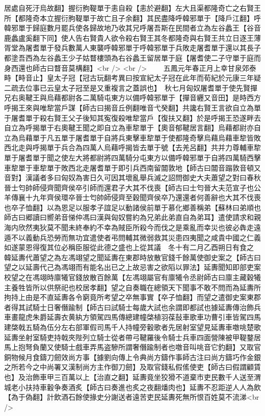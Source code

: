 居處自死汙烏故翻】握衍朐鞮單于恚自殺【恚於避翻】左大且渠都隆奇亡之右賢王所【都隆奇本立握衍朐鞮單于故亡且子余翻】其民盡降呼韓邪單于【降戶江翻】呼韓邪單于歸庭數月罷兵使各歸故地乃收其兄呼屠吾斯在民間者立為左谷蠡王【谷音鹿蠡盧奚翻下同】使人告右賢貴人欲令殺右賢王其冬都隆奇與右賢王共立日逐王薄胥堂為屠耆單于發兵數萬人東襲呼韓邪單于呼韓邪單于兵敗走屠耆單于還以其長子都塗吾西為左谷蠡王少子姑瞀樓頭為右谷蠡王留居單于庭【屠耆使二子守單于庭而身西還也師古曰瞀音莫構翻】<br />
<br />
　　五鳳元年春正月上幸甘泉郊泰畤【畤音止】皇太子冠【冠古玩翻考異曰按宣紀太子冠在此年而荀紀於元康三年疑二疏去位事已云皇太子冠至是又重複言之蓋誤也】　秋七月匈奴屠耆單于使先賢撣兄右奥鞬王與烏藉都尉各二萬騎屯東方以備呼韓邪單于【撣音纒又音田】是時西方呼揭王來與唯犂當戶謀【師古曰揭音丘例翻唯音弋癸翻】共讒右賢王言欲自立為單于屠耆單于殺右賢王父子後知其寃復殺唯犂當戶【復扶又翻】於是呼揭王恐遂畔去自立為呼揭單于右奧鞬王聞之即自立為車犂單于【奧音郁鞬居言翻】烏藉都尉亦自立為烏藉單于凡五單于屠耆單于自將兵東擊車犂單于使都隆奇擊烏藉烏藉車犂皆敗西北走與呼揭單于兵合為四萬人烏藉呼揭皆去單于號【去羌呂翻】共并力尊輔車犂單于屠耆單于聞之使左大將都尉將四萬騎分屯東方以備呼韓邪單于自將四萬騎西擊車犂單于車犂單于敗西北走屠耆單于即引兵西南留闒敦地【師古曰闒音蹋敦音頓又音對】漢議者多曰匈奴為害日久可因其壞亂舉兵滅之詔問御史大夫蕭望之對曰春秋晉士匄帥師侵齊聞齊侯卒引師而還君子大其不伐喪【師古曰士匄晉大夫范宣子也公羊傳襄十九年齊侯環卒晉士匄帥師侵齊至穀聞齊侯卒乃還還者何善辭也大其不伐喪也卒子恤翻】以為恩足以服孝子誼足以動諸侯前單于慕化鄉善稱弟【蘇林曰弟順也師古曰郷讀曰嚮弟音悌仲馮曰漢與匈奴嘗約為兄弟此弟直自為弟耳】遣使請求和親海内欣然夷狄莫不聞未終奉約不幸為賊臣所殺今而伐之是乘亂而幸災也彼必犇走遠遁不以義動兵恐勞而無功宜遣使者弔問輔其微弱救其災患四夷聞之咸貴中國之仁義如遂蒙恩得復其位必稱臣服從此德之盛也上從其議　冬十有二月乙酉朔日有食之　韓延夀代蕭望之為左馮翊望之聞延夀在東郡時放散官錢千餘萬使御史案之【師古曰望之以延壽代己為馮翊而有能名出已之上故忌害之欲䧟以罪法】延夀聞知即部吏案校望之在馮翊時廪犧官錢放散百餘萬【左馮翊屬官有廪犧令丞尉師古曰廪主藏穀犧主養牲皆所以供祭祀也校居孝翻】望之自奏職在總領天下聞事不敢不問而為延夀所拘持上由是不直延夀各令窮竟所考望之卒無事實【卒子恤翻】而望之遣御史案東郡者得其試騎士日奢僭踰制【師古曰試騎士每歲大試也余謂即都試也據延夀傳治飾兵車畫龍虎朱爵延壽衣黄紈方領駕四馬傳總建幢棨植羽葆鼔車歌車功曹引車皆駕四馬建棨戟五騎為伍分左右部軍假司馬千人持幢旁轂歌者先居射室望見延夀車噭咷楚歌延夀坐射室騎吏持戟夾陛列立騎士從者帶弓鞬羅後令騎士兵車四面營陳被甲鞮鍪居馬上抱弩負蘭又使騎士戲車弄馬盗驂所謂奢僭踰制者也噭音叫咷音它釣翻】又取官銅物候月食鑄刀劒效尚方事【據劉向傳上令典尚方鑄作事師古注曰尚方鑄巧作金銀之所若今之中尚署又漢制尚方主作御刀劒】及取官錢私假傜使吏【師古曰假謂顧賃也】及治飾車甲三百萬以上【治直之翻】延夀竟坐狡猾不道棄市吏民數千人送至渭城老小扶持車轂争奏酒炙【師古曰奏進也炙之夜翻燔肉也】延夀不忍距逆人人為飲【為于偽翻】計飲酒石餘使掾史分謝送者遠苦吏民延夀死無所恨百姓莫不流涕<br />
